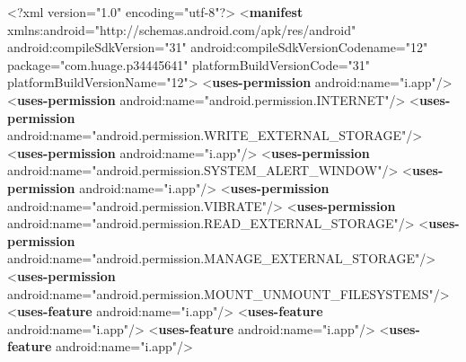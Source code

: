\documentclass[
]{article}
\newenvironment{Shaded}{}{}
\newcommand{\FunctionTok}[1]{\textcolor[rgb]{0.02,0.16,0.49}{#1}}
\newcommand{\KeywordTok}[1]{\textcolor[rgb]{0.00,0.44,0.13}{\textbf{#1}}}
\newcommand{\NormalTok}[1]{#1}
\newcommand{\OtherTok}[1]{\textcolor[rgb]{0.00,0.44,0.13}{#1}}
\newcommand{\StringTok}[1]{\textcolor[rgb]{0.25,0.44,0.63}{#1}}
\begin{document}
\begin{Shaded}
\begin{Highlighting}[]
\FunctionTok{\textless{}?xml}\OtherTok{ version=}\StringTok{"1.0"}\OtherTok{ encoding=}\StringTok{"utf{-}8"}\FunctionTok{?\textgreater{}}
\NormalTok{\textless{}}\KeywordTok{manifest}\OtherTok{ xmlns:android=}\StringTok{"http://schemas.android.com/apk/res/android"}\OtherTok{ android:compileSdkVersion=}\StringTok{"31"}\OtherTok{ android:compileSdkVersionCodename=}\StringTok{"12"}\OtherTok{ package=}\StringTok{"com.huage.p34445641"}\OtherTok{ platformBuildVersionCode=}\StringTok{"31"}\OtherTok{ platformBuildVersionName=}\StringTok{"12"}\NormalTok{\textgreater{}}
\NormalTok{    \textless{}}\KeywordTok{uses{-}permission}\OtherTok{ android:name=}\StringTok{"i.app"}\NormalTok{/\textgreater{}}
\NormalTok{    \textless{}}\KeywordTok{uses{-}permission}\OtherTok{ android:name=}\StringTok{"android.permission.INTERNET"}\NormalTok{/\textgreater{}}
\NormalTok{    \textless{}}\KeywordTok{uses{-}permission}\OtherTok{ android:name=}\StringTok{"android.permission.WRITE\_EXTERNAL\_STORAGE"}\NormalTok{/\textgreater{}}
\NormalTok{    \textless{}}\KeywordTok{uses{-}permission}\OtherTok{ android:name=}\StringTok{"i.app"}\NormalTok{/\textgreater{}}
\NormalTok{    \textless{}}\KeywordTok{uses{-}permission}\OtherTok{ android:name=}\StringTok{"android.permission.SYSTEM\_ALERT\_WINDOW"}\NormalTok{/\textgreater{}}
\NormalTok{    \textless{}}\KeywordTok{uses{-}permission}\OtherTok{ android:name=}\StringTok{"i.app"}\NormalTok{/\textgreater{}}
\NormalTok{    \textless{}}\KeywordTok{uses{-}permission}\OtherTok{ android:name=}\StringTok{"android.permission.VIBRATE"}\NormalTok{/\textgreater{}}
\NormalTok{    \textless{}}\KeywordTok{uses{-}permission}\OtherTok{ android:name=}\StringTok{"android.permission.READ\_EXTERNAL\_STORAGE"}\NormalTok{/\textgreater{}}
\NormalTok{    \textless{}}\KeywordTok{uses{-}permission}\OtherTok{ android:name=}\StringTok{"android.permission.MANAGE\_EXTERNAL\_STORAGE"}\NormalTok{/\textgreater{}}
\NormalTok{    \textless{}}\KeywordTok{uses{-}permission}\OtherTok{ android:name=}\StringTok{"android.permission.MOUNT\_UNMOUNT\_FILESYSTEMS"}\NormalTok{/\textgreater{}}
\NormalTok{    \textless{}}\KeywordTok{uses{-}feature}\OtherTok{ android:name=}\StringTok{"i.app"}\NormalTok{/\textgreater{}}
\NormalTok{    \textless{}}\KeywordTok{uses{-}feature}\OtherTok{ android:name=}\StringTok{"i.app"}\NormalTok{/\textgreater{}}
\NormalTok{    \textless{}}\KeywordTok{uses{-}feature}\OtherTok{ android:name=}\StringTok{"i.app"}\NormalTok{/\textgreater{}}
\NormalTok{    \textless{}}\KeywordTok{uses{-}feature}\OtherTok{ android:name=}\StringTok{"i.app"}\NormalTok{/\textgreater{}}

\end{Highlighting}
\end{Shaded}
\end{document}
